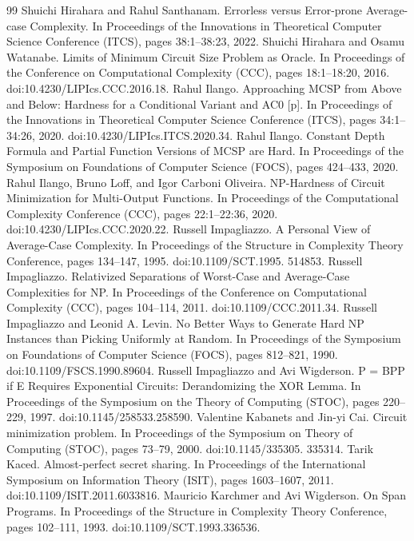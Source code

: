 \begin{thebibliography}{99}
 Shuichi Hirahara and Rahul Santhanam. Errorless versus Error-prone Average-case Complexity. In Proceedings of the Innovations in Theoretical Computer Science Conference (ITCS), pages 38:1–38:23, 2022.
 Shuichi Hirahara and Osamu Watanabe. Limits of Minimum Circuit Size Problem as Oracle. In Proceedings of the Conference on Computational Complexity (CCC), pages 18:1–18:20, 2016. doi:10.4230/LIPIcs.CCC.2016.18.
 Rahul Ilango. Approaching MCSP from Above and Below: Hardness for a Conditional Variant and AC0 [p]. In Proceedings of the Innovations in Theoretical Computer Science Conference (ITCS), pages 34:1–34:26, 2020. doi:10.4230/LIPIcs.ITCS.2020.34.
 Rahul Ilango. Constant Depth Formula and Partial Function Versions of MCSP are Hard. In Proceedings of the Symposium on Foundations of Computer Science (FOCS), pages 424–433, 2020.
 Rahul Ilango, Bruno Loff, and Igor Carboni Oliveira. NP-Hardness of Circuit Minimization for Multi-Output Functions. In Proceedings of the Computational Complexity Conference (CCC), pages 22:1–22:36, 2020. doi:10.4230/LIPIcs.CCC.2020.22.
 Russell Impagliazzo. A Personal View of Average-Case Complexity. In Proceedings of the Structure in Complexity Theory Conference, pages 134–147, 1995. doi:10.1109/SCT.1995. 514853.
 Russell Impagliazzo. Relativized Separations of Worst-Case and Average-Case Complexities for NP. In Proceedings of the Conference on Computational Complexity (CCC), pages 104–114, 2011. doi:10.1109/CCC.2011.34.
 Russell Impagliazzo and Leonid A. Levin. No Better Ways to Generate Hard NP Instances than Picking Uniformly at Random. In Proceedings of the Symposium on Foundations of Computer Science (FOCS), pages 812–821, 1990. doi:10.1109/FSCS.1990.89604.
 Russell Impagliazzo and Avi Wigderson. P = BPP if E Requires Exponential Circuits: Derandomizing the XOR Lemma. In Proceedings of the Symposium on the Theory of Computing (STOC), pages 220–229, 1997. doi:10.1145/258533.258590.
 Valentine Kabanets and Jin-yi Cai. Circuit minimization problem. In Proceedings of the Symposium on Theory of Computing (STOC), pages 73–79, 2000. doi:10.1145/335305. 335314.
 Tarik Kaced. Almost-perfect secret sharing. In Proceedings of the International Symposium on Information Theory (ISIT), pages 1603–1607, 2011. doi:10.1109/ISIT.2011.6033816.
 Mauricio Karchmer and Avi Wigderson. On Span Programs. In Proceedings of the Structure in Complexity Theory Conference, pages 102–111, 1993. doi:10.1109/SCT.1993.336536.

\end{thebibliography}
